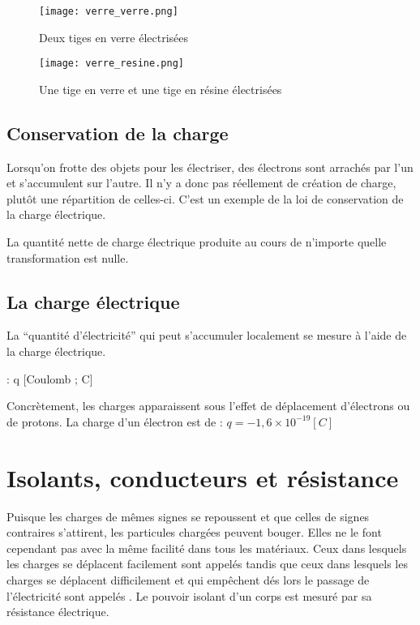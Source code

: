 \begin{figure}[!ht]
    \centering
    \begin{minipage}[b]{.47\linewidth}
        \centering
        \texttt{[image: verre\_verre.png]}
        \caption{Deux tiges en verre électrisées}
        \label{verre_verre}
    \end{minipage}
    \begin{minipage}[b]{.47\linewidth}
        \centering
        \texttt{[image: verre\_resine.png]}
        \caption{Une tige en verre et une tige en résine électrisées}
        \label{verre_resine}
    \end{minipage}
\end{figure}

\subsection{Conservation de la charge}
Lorsqu'on frotte des objets pour les électriser, des électrons sont arrachés par l'un et s'accumulent sur l'autre. Il n'y a donc pas réellement de création de charge, plutôt une répartition de celles-ci. C'est un exemple de la loi de conservation de la charge électrique.
\begin{encadre}
    La quantité nette de charge électrique produite au cours de n'importe quelle transformation est nulle.
\end{encadre}

\newpage

\subsection{La charge électrique}
La \enquote{quantité d'électricité} qui peut s'accumuler localement se mesure à l'aide de la charge électrique.
\begin{encadre}
     : q [Coulomb ; C]
\end{encadre}
Concrètement, les charges apparaissent sous l'effet de déplacement d'électrons ou de protons. La charge d'un électron est de : \(q=- 1,6 \times 10^{-19}[C]\)

\section{Isolants, conducteurs et résistance}
Puisque les charges de mêmes signes se repoussent et que celles de signes contraires s'attirent, les particules chargées peuvent bouger. Elles ne le font cependant pas avec la même facilité dans tous les matériaux. Ceux dans lesquels les charges se déplacent facilement sont appelés tandis que ceux dans lesquels les charges se déplacent difficilement et qui empêchent dés lors le passage de l'électricité sont appelés . Le pouvoir isolant d'un corps est mesuré par sa résistance électrique.

